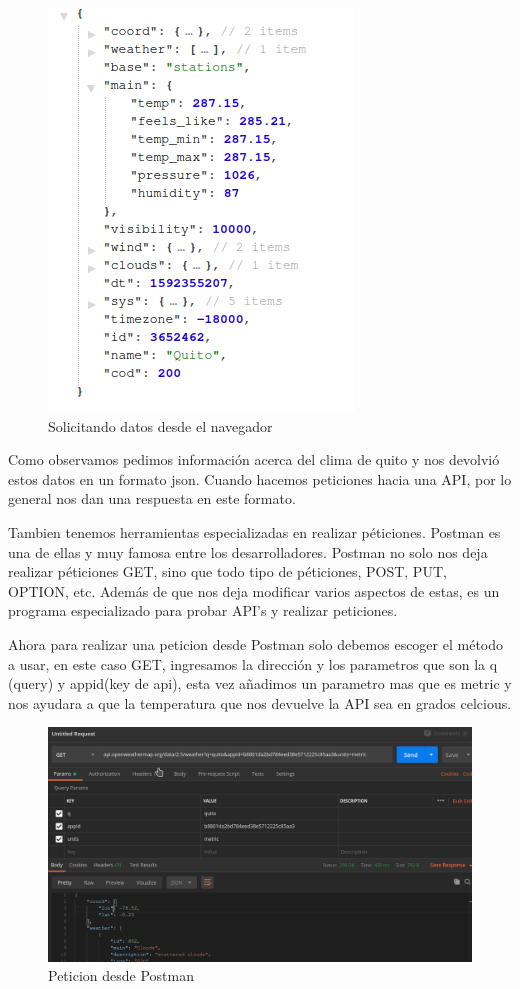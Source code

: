 \documentclass[12pt]{article}
\begin{document}
\begin{figure}[H]
    \centering
    \includegraphics{assets/images/browser.png}
    \caption{Solicitando datos desde el navegador}
\end{figure}

Como observamos pedimos información acerca del clima de quito y nos devolvió estos datos en un formato json. Cuando hacemos peticiones hacia una API, por lo general nos dan una respuesta en este formato.

Tambien tenemos herramientas especializadas en realizar péticiones. Postman es una de ellas y muy famosa entre los desarrolladores. Postman no solo nos deja realizar péticiones GET, sino que todo tipo de péticiones, POST, PUT, OPTION, etc. Además de que nos deja modificar varios aspectos de estas, es un programa especializado para probar API's y realizar peticiones.

Ahora para realizar una peticion desde Postman solo debemos escoger el método a usar, en este caso GET, ingresamos la dirección y los parametros que son la q (query) y appid(key de api), esta vez añadimos un parametro mas que es metric y nos ayudara a que la temperatura que nos devuelve la API sea en grados celcious.

\begin{figure}[H]
    \centering
    \includegraphics[scale=.5]{assets/images/postman.png}
    \caption{Peticion desde Postman}
\end{figure}
\end{document}

